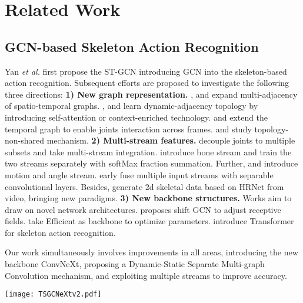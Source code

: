 \documentclass[10pt,twocolumn,letterpaper]{article}
\newcommand{\method}{TSGCNeXt\xspace}
\begin{document}
\section{Related Work}
\label{sec:related}
\subsection{GCN-based Skeleton Action Recognition}
\label{ssec:related_skeleton}
Yan \textit{et al.}\cite{yan2018spatial} first propose the ST-GCN introducing GCN into the skeleton-based action recognition. Subsequent efforts are proposed to investigate the following three directions:
\textbf{1) New graph representation.} \cite{li2019actional}, \cite{huang2020spatio} and \cite{liu2020disentangling} expand multi-adjacency of spatio-temporal graphs. \cite{shi2019two}, \cite{zhang2020semantics} and \cite{ye2020dynamic} learn dynamic-adjacency topology by introducing self-attention or context-enriched technology. \cite{obinata2021temporal} and \cite{zeng2021learning} extend the temporal graph to enable joints interaction across frames. \cite{cheng2020decoupling} and \cite{chen2021channel} study topology-non-shared mechanism.
\textbf{2) Multi-stream features.} \cite{song2020richly} decouple joints to multiple subsets and take multi-stream integration. \cite{li2019actional} introduce bone stream and train the two streams separately with softMax fraction summation. Further, \cite{shi2019skeleton} and \cite{qin2021fusing} introduce motion and angle stream. \cite{song2022constructing} early fuse multiple input streams with separable convolutional layers. Besides, \cite{duan2021revisiting} generate 2d skeletal data based on HRNet from video, bringing new paradigms.
\textbf{3) New backbone structures.} Works aim to draw on novel network architectures. \cite{cheng2020skeleton} proposes shift GCN to adjust receptive fields. \cite{song2022constructing} take Efficient as backbone to optimize parameters. \cite{bai2021gcst} introduce Transformer for skeleton action recognition. 

Our work simultaneously involves improvements in all areas, introducing the new backbone ConvNeXt, proposing a Dynamic-Static Separate Multi-graph Convolution mechanism, and exploiting multiple streams to improve accuracy.
\begin{figure*}[htp]
  \centering
  \texttt{[image: TSGCNeXtv2.pdf]}
  \caption{\label{fig:architecture}The overall pipeline of \method, including architecture and block details. The DS-SMG in red dashed box is the Dynamic-Static Separate Multi-graph Convolution. The compute ratio of three stage is designed to be  or .}
  \vspace{-1em}
\end{figure*}
\end{document}
